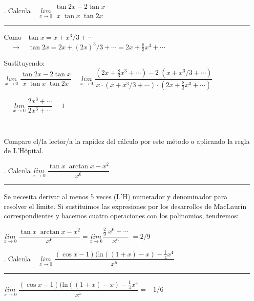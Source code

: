 \vspace{5mm}	
\begin{miejercicio}
	.  Calcula $\quad \underset{x\to 0}{lim}\;{\dfrac {\tan 2x - 2 \tan x}{x \; \tan x \; \tan 2x}}$	
	
	\rule{200pt}{0.1pt}
	
	Como
	$ \ \ \tan x=x+x^3/3+ \cdots$
	$\quad\to \quad \tan 2x = 2x + (2x)^3/3 + \cdots = 2x + \frac 8 3 x^3 + \cdots $
	
	Sustituyendo:
	$\ \underset{x\to 0}{lim}\;{\dfrac {\tan 2x - 2 \tan x}{x \; \tan x \; \tan 2x}}= \underset{x\to 0}{lim}\; { \dfrac {  (2x + \frac 8 3 x^3 + \cdots ) - 2\; (x+x^3/3+ \cdots) }  {  x\cdot (x+x^3/3+ \cdots) \cdot(2x + \frac 8 3 x^3 + \cdots )   }    } =$
	
	$ = \underset{x\to 0}{lim}\;{\dfrac {2x^3+\cdots}{2x^3+\cdots}}=1$ 
	
	$\quad$
	
	Compare el/la lector/a la rapidez del cálculo por este método o aplicando la regla de L'Hôpital.

\end{miejercicio}

\vspace{5mm}
\begin{miejercicio} 
.  Calcula $\underset{x\to 0}{lim}\;{\dfrac {\tan x \; \arctan x- x^2}{x^6}}$

\rule{200pt}{0.1pt}

	Se necesita derivar al menos 5 veces (L'H) numerador y denominador para resolver el límite.
	Si sustituimos las expresiones por los desarrollos de MacLaurin correspondientes y hacemos cuatro operaciones con los polinomios, tendremos:
	
	\vspace{2mm} $\underset{x\to 0}{lim}\;{\dfrac {\tan x \; \arctan x- x^2}{x^6}}= \underset{x\to 0}{lim}{\dfrac {\frac 2 9 \; x^6 + \cdots }{x^6}}\;=2/9$
\end{miejercicio}

\vspace{5mm}
\begin{miejercicio} 
.  Calcula $\quad \underset{x\to 0}{lim}\;{\dfrac {(\cos x -1)(\mathrm{ln}((1+x)-x)-\frac 1 4 x^4}{x^5}}$

\rule{200pt}{0.1pt}

$\underset{x\to 0}{lim}\;{\dfrac {(\cos x -1)(\mathrm{ln}((1+x)-x)-\frac 1 4 x^4}{x^5}} = -1/6$
		
\end{miejercicio}

